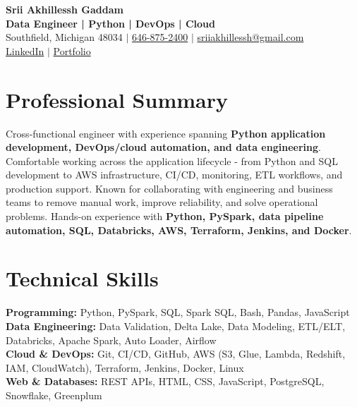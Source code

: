 \documentclass[letterpaper,10pt]{article}
\begin{document}
\fontsize{9.35pt}{10.45pt}\selectfont

\begin{center}
    {\LARGE \textbf{Srii Akhillessh Gaddam}} \\[-1pt]
    \textbf{Data Engineer | Python | DevOps | Cloud} \\[2pt]
    Southfield, Michigan 48034 $|$
    \href{tel:6468752400}{646-875-2400} $|$
    \href{mailto:sriiakhillessh@gmail.com}{sriiakhillessh@gmail.com} \\[1pt]
    \href{https://www.linkedin.com/in/srii-akhiilessh-gaddam-b48668191/}{LinkedIn} $|$
    \href{https://sriiakhillesshg.github.io/portfolio/}{Portfolio}
\end{center}
\vspace{-8pt}

\section{Professional Summary}
\small{Cross-functional engineer with experience spanning \textbf{Python application development, DevOps/cloud automation, and data engineering}. Comfortable working across the application lifecycle - from Python and SQL development to AWS infrastructure, CI/CD, monitoring, ETL workflows, and production support. Known for collaborating with engineering and business teams to remove manual work, improve reliability, and solve operational problems. Hands-on experience with \textbf{Python, PySpark, data pipeline automation, SQL, Databricks, AWS, Terraform, Jenkins, and Docker}.}

\section{Technical Skills}
\small{
\textbf{Programming:} Python, PySpark, SQL, Spark SQL, Bash, Pandas, JavaScript \\
\textbf{Data Engineering:} Data Validation, Delta Lake, Data Modeling, ETL/ELT, Databricks, Apache Spark, Auto Loader, Airflow \\
\textbf{Cloud \& DevOps:} Git, CI/CD, GitHub, AWS (S3, Glue, Lambda, Redshift, IAM, CloudWatch), Terraform, Jenkins, Docker, Linux \\
\textbf{Web \& Databases:} REST APIs, HTML, CSS, JavaScript, PostgreSQL, Snowflake, Greenplum
}

\end{document}

